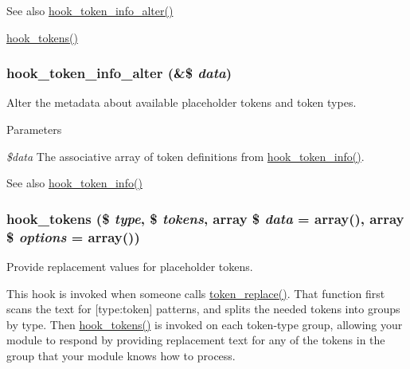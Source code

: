 \begin{DoxySeeAlso}{See also}
\hyperlink{group__hooks_ga87392434688c9f52c4066de4ab9d73a8}{hook\_\-token\_\-info\_\-alter()} 

\hyperlink{group__hooks_ga3bfd87d9a19b2397b0f970e1cff7ea4f}{hook\_\-tokens()} 
\end{DoxySeeAlso}
\hypertarget{group__hooks_ga87392434688c9f52c4066de4ab9d73a8}{
\subsubsection[{hook\_\-token\_\-info\_\-alter}]{\setlength{\rightskip}{0pt plus 5cm}hook\_\-token\_\-info\_\-alter (\&\$ {\em data})}}
\label{group__hooks_ga87392434688c9f52c4066de4ab9d73a8}
Alter the metadata about available placeholder tokens and token types.


\begin{DoxyParams}{Parameters}
\item[{\em \$data}]The associative array of token definitions from \hyperlink{group__hooks_gab868597197cf36911f95dcd29ae0b954}{hook\_\-token\_\-info()}.\end{DoxyParams}
\begin{DoxySeeAlso}{See also}
\hyperlink{group__hooks_gab868597197cf36911f95dcd29ae0b954}{hook\_\-token\_\-info()} 
\end{DoxySeeAlso}
\hypertarget{group__hooks_ga3bfd87d9a19b2397b0f970e1cff7ea4f}{
\subsubsection[{hook\_\-tokens}]{\setlength{\rightskip}{0pt plus 5cm}hook\_\-tokens (\$ {\em type}, \/  \$ {\em tokens}, \/  array \$ {\em data} = {\ttfamily array()}, \/  array \$ {\em options} = {\ttfamily array()})}}
\label{group__hooks_ga3bfd87d9a19b2397b0f970e1cff7ea4f}
Provide replacement values for placeholder tokens.

This hook is invoked when someone calls \hyperlink{includes_2token_8inc_a47eb294b05ca8d04439a9a82ccc4d82a}{token\_\-replace()}. That function first scans the text for \mbox{[}type:token\mbox{]} patterns, and splits the needed tokens into groups by type. Then \hyperlink{group__hooks_ga3bfd87d9a19b2397b0f970e1cff7ea4f}{hook\_\-tokens()} is invoked on each token-\/type group, allowing your module to respond by providing replacement text for any of the tokens in the group that your module knows how to process.

